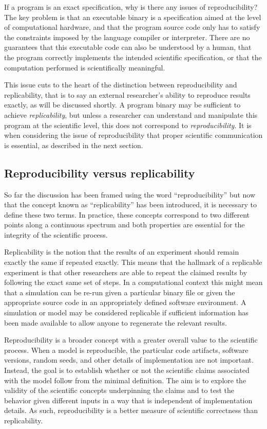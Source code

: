 \documentclass[phd,ianc,twoside]{infthesis}
\begin{document}
If a program is an exact specification, why is there any issues of
reproducibility? The key problem is that an executable binary is a
specification aimed at the level of computational hardware, and that the
program source code only has to satisfy the constraints imposed by the
language compiler or interpreter. There are no guarantees that this
executable code can also be understood by a human, that the program
correctly implements the intended scientific specification, or that the
computation performed is scientifically meaningful.

This issue cuts to the heart of the distinction between reproducibility and
replicability, that is to say an external researcher's ability to
reproduce results exactly, as will be discussed shortly. A program
binary may be sufficient to achieve \emph{replicability}, but unless a
researcher can understand and manipulate this program at the scientific
level, this does not correspond to \emph{reproducibility}. It is when
considering the issue of reproducibility that proper scientific
communication is essential, as described in the next section.

\subsection{Reproducibility versus replicability}

So far the discussion has been framed using the word ``reproducibility''
but now that the concept known as ``replicability'' has been introduced,
it is necessary to define these two terms. In practice, these concepts
correspond to two different points along a continuous spectrum and both
properties are essential for the integrity of the scientific process.

Replicability is the notion that the results of an experiment should
remain exactly the same if repeated exactly. This means that the
hallmark of a replicable experiment is that other researchers are able
to repeat the claimed results by following the exact same set of
steps. In a computational context this might mean that a simulation can
be re-run given a particular binary file or given the appropriate source
code in an appropriately defined software environment. A simulation or
model may be considered replicable if sufficient information has been
made available to allow anyone to regenerate the relevant results.

Reproducibility is a broader concept with a greater overall value to the
scientific process. When a model is reproducible, the particular code
artifacts, software versions, random seeds, and other details of
implementation are not important. Instead, the goal is to establish
whether or not the scientific claims associated with the model follow
from the minimal definition. The aim is to explore the validity of the
scientific concepts underpinning the claims and to test the behavior
given different inputs in a way that is independent of implementation
details. As such, reproducibility is a better measure of scientific
correctness than replicability.
\end{document}
